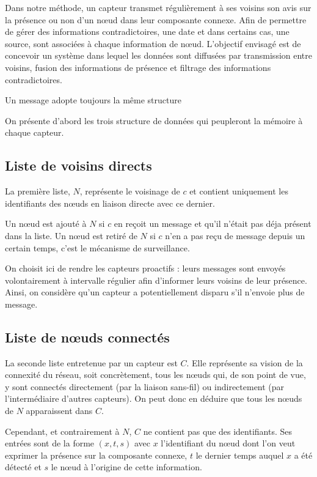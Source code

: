 \documentclass[10pt]{article}
\begin{document}
\begin{multicols}{2}
Dans notre méthode, un capteur transmet régulièrement à ses voisins
son avis sur la présence ou non d'un n\oe ud dans leur composante
connexe. Afin de permettre de gérer des informations contradictoires,
une date et dans certains cas, une source, sont associées à chaque
information de n\oe ud. L'objectif envisagé est de concevoir un
système dans lequel les données sont diffusées par transmission entre
voisins, fusion des informations de présence et filtrage des
informations contradictoires.

Un message adopte toujours la même structure

On présente d'abord les trois structure de données qui peupleront la
mémoire à chaque capteur.

\subsection*{Liste de voisins directs}

La première liste, $N$, représente le voisinage de $c$ et contient
uniquement les identifiants des n\oe uds en liaison directe avec ce
dernier.

Un n\oe ud est ajouté à $N$ si $c$ en reçoit un message et qu'il
n'était pas déja présent dans la liste. Un n\oe ud est retiré de $N$
si $c$ n'en a pas reçu de message depuis un certain temps, c'est le
mécanisme de surveillance.

On choisit ici de rendre les capteurs proactifs : leurs messages sont
envoyés volontairement à intervalle régulier afin d'informer leurs
voisins de leur présence. Ainsi, on considère qu'un capteur a
potentiellement disparu s'il n'envoie plus de message.

\subsection*{Liste de n\oe uds connectés}

La seconde liste entretenue par un capteur est $C$. Elle représente sa
vision de la connexité du réseau, soit concrètement, tous les n\oe uds
qui, de son point de vue, y sont connectés directement (par la liaison
sans-fil) ou indirectement (par l'intermédiaire d'autres capteurs). On
peut donc en déduire que tous les n\oe uds de $N$ apparaissent dans
$C$.

Cependant, et contrairement à $N$, $C$ ne contient pas que des
identifiants. Ses entrées sont de la forme $(x,t,s)$ avec $x$
l'identifiant du n\oe ud dont l'on veut exprimer la présence sur la
composante connexe, $t$ le dernier temps auquel $x$ a été détecté et
$s$ le n\oe ud à l'origine de cette information.


\end{multicols}
\end{document}
